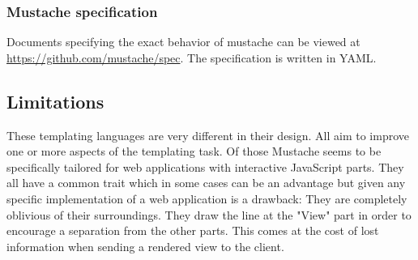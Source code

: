 \documentclass[thesis.tex]{subfiles}
\begin{document}
\subsubsection{Mustache specification}
Documents specifying the exact behavior of mustache can be viewed at
\url{https://github.com/mustache/spec}. The specification is written in YAML.

\subsection{Limitations}
These templating languages are very different in their design.
All aim to improve one or more aspects of the templating task.
Of those Mustache seems to be specifically tailored for web applications
with interactive JavaScript parts.
They all have a common trait which in some cases can be an advantage
but given any specific implementation of a web application is a drawback:
They are completely oblivious of their surroundings. They draw the line
at the "View" part in order to encourage a separation from the other
parts. This comes at the cost of lost information when sending a
rendered view to the client.
\end{document}
